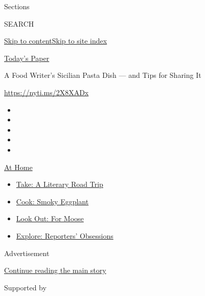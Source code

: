 Sections

SEARCH

\protect\hyperlink{site-content}{Skip to
content}\protect\hyperlink{site-index}{Skip to site index}

\href{https://myaccount.nytimes.com/auth/login?response_type=cookie\&client_id=vi}{}

\href{https://www.nytimes.com/section/todayspaper}{Today's Paper}

A Food Writer's Sicilian Pasta Dish --- and Tips for Sharing It

\url{https://nyti.ms/2X8XADx}

\begin{itemize}
\item
\item
\item
\item
\item
\end{itemize}

\href{https://www.nytimes.com/spotlight/at-home?action=click\&pgtype=Article\&state=default\&region=TOP_BANNER\&context=at_home_menu}{At
Home}

\begin{itemize}
\tightlist
\item
  \href{https://www.nytimes.com/2020/07/28/books/time-for-a-literary-road-trip.html?action=click\&pgtype=Article\&state=default\&region=TOP_BANNER\&context=at_home_menu}{Take:
  A Literary Road Trip}
\item
  \href{https://www.nytimes.com/2020/07/29/magazine/bored-with-your-home-cooking-some-smoky-eggplant-will-fix-that.html?action=click\&pgtype=Article\&state=default\&region=TOP_BANNER\&context=at_home_menu}{Cook:
  Smoky Eggplant}
\item
  \href{https://www.nytimes.com/2020/07/27/travel/moose-michigan-isle-royale.html?action=click\&pgtype=Article\&state=default\&region=TOP_BANNER\&context=at_home_menu}{Look
  Out: For Moose}
\item
  \href{https://www.nytimes.com/interactive/2020/at-home/even-more-reporters-editors-diaries-lists-recommendations.html?action=click\&pgtype=Article\&state=default\&region=TOP_BANNER\&context=at_home_menu}{Explore:
  Reporters' Obsessions}
\end{itemize}

Advertisement

\protect\hyperlink{after-top}{Continue reading the main story}

Supported by

